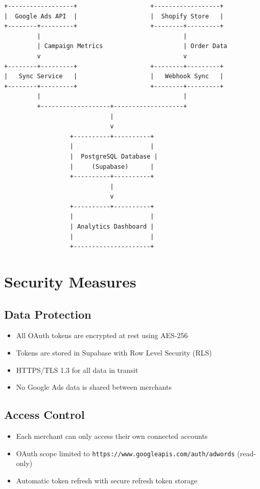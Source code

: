 \documentclass[11pt,a4paper]{article}
\begin{document}
\begin{small}
\begin{verbatim}
+------------------+                    +------------------+
|  Google Ads API  |                    |  Shopify Store   |
+--------+---------+                    +--------+---------+
         |                                       |
         | Campaign Metrics                      | Order Data
         v                                       v
+--------+---------+                    +--------+---------+
|   Sync Service   |                    |   Webhook Sync   |
+--------+---------+                    +--------+---------+
         |                                       |
         +-------------------+-------------------+
                             |
                             v
                  +----------+----------+
                  |                     |
                  |  PostgreSQL Database |
                  |     (Supabase)      |
                  +----------+----------+
                             |
                             v
                  +----------+----------+
                  |                     |
                  | Analytics Dashboard |
                  |                     |
                  +---------------------+
\end{verbatim}
\end{small}

\section{Security Measures}

\subsection{Data Protection}
\begin{itemize}
    \item All OAuth tokens are encrypted at rest using AES-256
    \item Tokens are stored in Supabase with Row Level Security (RLS)
    \item HTTPS/TLS 1.3 for all data in transit
    \item No Google Ads data is shared between merchants
\end{itemize}

\subsection{Access Control}
\begin{itemize}
    \item Each merchant can only access their own connected accounts
    \item OAuth scope limited to \texttt{https://www.googleapis.com/auth/adwords} (read-only)
    \item Automatic token refresh with secure refresh token storage
\end{itemize}
\end{document}
